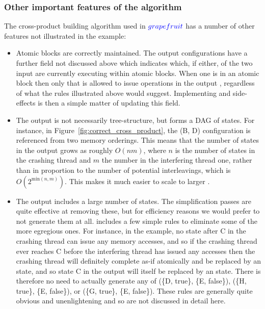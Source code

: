 \subsubsection{Other important features of the algorithm}

The cross-product building algorithm used in $\textcolor{blue}{grapefruit}$ has a
number of other features not illustrated in the example:

\begin{itemize}
\item
  Atomic blocks are correctly maintained.  The output {\StateMachine}
  configurations have a further field not discussed above which
  indicates which, if either, of the two input {\StateMachines} are
  currently executing within atomic blocks.  When one {\StateMachine}
  is in an atomic block then only that {\StateMachine} is allowed to
  issue operations in the output {\StateMachine}, regardless of what
  the rules illustrated above would suggest.  Implementing
   and  side-effects is then a
  simple matter of updating this field.

\item The output {\StateMachine} is not necessarily tree-structure,
  but forms a DAG of states.  For instance, in
  Figure~\ref{fig:correct_cross_product}, the (B, D) configuration is
  referenced from two memory orderings.  This means that the number of
  states in the output {\StateMachine} grows as roughly $O(nm)$, where
  $n$ is the number of states in the crashing thread {\StateMachine}
  and $m$ the number in the interfering thread one, rather than in
  proportion to the number of potential interleavings, which is
  $O(2^{\mathrm{min}(n,m)})$.  This makes it much easier to scale
  {\technique} to larger {\StateMachines}.

\item The output {\StateMachine} includes a large number of
   states.  The {\StateMachine} simplification passes
  are quite effective at removing these, but for efficiency reasons we
  would prefer to not generate them at all.  {\Implementation}
  includes a few simple rules to eliminate some of the more egregious
  ones.  For instance, in the example, no state after C in the
  crashing thread {\StateMachine} can issue any memory accesses, and
  so if the crashing thread ever reaches C before the interfering
  thread has issued any accesses then the crashing thread will
  definitely complete as-if atomically and be replaced by an
   state, and so state C in the output
        {\StateMachine} will itself be replaced by an
         state.  There is therefore no need to
        actually generate any of (\{D, true\}, \{E, false\}), (\{H,
        true\}, \{E, false\}), or (\{G, true\}, \{E, false\}).  These
        rules are generally quite obvious and unenlightening and so
        are not discussed in detail here.
\end{itemize}

